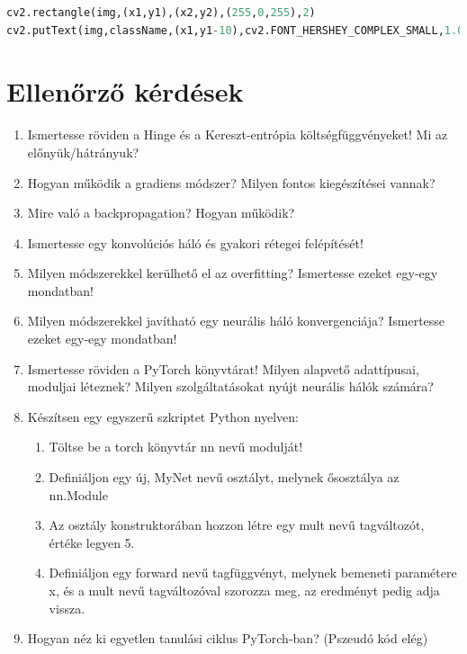 \documentclass[12pt,a4paper,oneside]{report}             %
\begin{document}
\begin{lstlisting}[language=Python]
cv2.rectangle(img,(x1,y1),(x2,y2),(255,0,255),2)
cv2.putText(img,className,(x1,y1-10),cv2.FONT_HERSHEY_COMPLEX_SMALL,1.0,(0,255,0))
\end{lstlisting}



\chapter{Ellenőrző kérdések}

\begin{enumerate}
\item Ismertesse röviden a Hinge és a Kereszt-entrópia költségfüggvényeket! Mi az előnyük/hátrányuk?
\item Hogyan működik a gradiens módszer? Milyen fontos kiegészítései vannak?
\item Mire való a backpropagation? Hogyan működik?
\item Ismertesse egy konvolúciós háló és gyakori rétegei felépítését!
\item Milyen módszerekkel kerülhető el az overfitting? Ismertesse ezeket egy-egy mondatban!
\item Milyen módszerekkel javítható egy neurális háló konvergenciája? Ismertesse ezeket egy-egy mondatban!
\item Ismertesse röviden a PyTorch könyvtárat! Milyen alapvető adattípusai, moduljai léteznek? Milyen szolgáltatásokat nyújt neurális hálók számára?
\item Készítsen egy egyszerű szkriptet Python nyelven: 
\begin{enumerate}
\item Töltse be a torch könyvtár nn nevű modulját!
\item Definiáljon egy új, MyNet nevű osztályt, melynek ősosztálya az nn.Module
\item Az osztály konstruktorában hozzon létre egy mult nevű tagváltozót, értéke legyen 5.
\item Definiáljon egy forward nevű tagfüggvényt, melynek bemeneti paramétere x, és a mult nevű tagváltozóval szorozza meg, az eredményt pedig adja vissza.
\end{enumerate}
\item Hogyan néz ki egyetlen tanulási ciklus PyTorch-ban? (Pszeudó kód elég)
\end{enumerate}


\printbibliography
\end{document}
